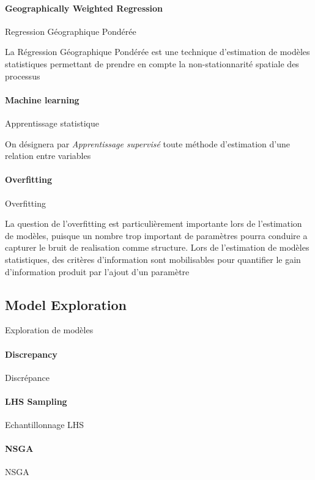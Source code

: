\paragraph{Geographically Weighted Regression}{Regression Géographique Pondérée}


La Régression Géographique Pondérée est une technique d'estimation de modèles statistiques permettant de prendre en compte la non-stationnarité spatiale des processus




\paragraph{Machine learning}{Apprentissage statistique}


On désignera par \emph{Apprentissage supervisé} toute méthode d'estimation d'une relation entre variables 




\paragraph{Overfitting}{Overfitting}


La question de l'overfitting est particulièrement importante lors de l'estimation de modèles, puisque un nombre trop important de paramètres pourra conduire a capturer le bruit de realisation comme structure. Lors de l'estimation de modèles statistiques, des critères d'information sont mobilisables pour quantifier le gain d'information produit par l'ajout d'un paramètre





\subsection*{Model Exploration}{Exploration de modèles}


\paragraph{Discrepancy}{Discrépance}




\paragraph{LHS Sampling}{Echantillonnage LHS}




\paragraph{NSGA}{NSGA}







